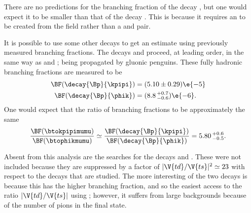 There are no predictions for the branching fraction of the decay \btophikmumu,
but one would expect it to be smaller than that of the decay \btokpipimumu.
This is because it requires an \ssbar to be created from the \QCD field rather than a \uubar and
\ddbar pair.

It is possible to use some other decays to get an estimate using previously measured branching
fractions.
The decays \decay{\Bp}{\kpipi} and \decay{\Bp}{\phik} proceed, at leading order, in the same way as
\btokpipimumu and \btophikmumu; being propagated by gluonic penguins.
These fully hadronic branching fractions are measured to be
\begin{align}
  \BF(\decay{\Bp}{\kpipi}) &= (5.10\pm0.29)\e{-5} \nonumber\\
  \BF(\decay{\Bp}{\phik}) &= (8.8\,^{+0.7}_{-0.6})\e{-6}.
\end{align}
One would expect that the ratio of branching fractions to be approximately the same
\begin{equation}
  \frac{\BF(\btokpipimumu)}{\BF(\btophikmumu)}
  \simeq
  \frac{\BF(\decay{\Bp}{\kpipi})}{\BF(\decay{\Bp}{\phik})}
  =
  5.80\,^{+0.6}_{-0.5}.
\end{equation}


Absent from this analysis are the searches for the decays \decay{\Bp}{\Kp\Km\pip\mumu}
and \decay{\Bp}{\pipi\pim\mumu}.
These were not included because they are suppressed by a factor of $|\V{td}/\V{ts}|^2\simeq23$ with
respect to the decays that are studied.
The more interesting of the two decays is \decay{\Bp}{\pipi\pim\mumu} because this has the higher
branching fraction, and so the easiest access to the ratio $|\V{td}/\V{ts}|$ using \btokpipimumu;
however, it suffers from large backgrounds because of the number of pions in the final state.







